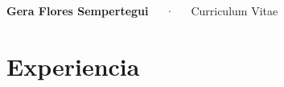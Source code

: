\documentclass[11pt,a4paper,]{awesome-cv}
\begin{document}
\makecvheader

\makecvfooter
  {}
    {\huge\textbf{Gera Flores Sempertegui}~~~·~~~Curriculum Vitae}
  {\thepage}





\thispagestyle{empty}

\smallskip

\vspace{-0.50cm}

\hspace{0.25cm}\color{black}{\Large\faBriefcase}\hspace{0.25cm}\section{Experiencia}

\vspace{-0.25cm}
\end{document}
